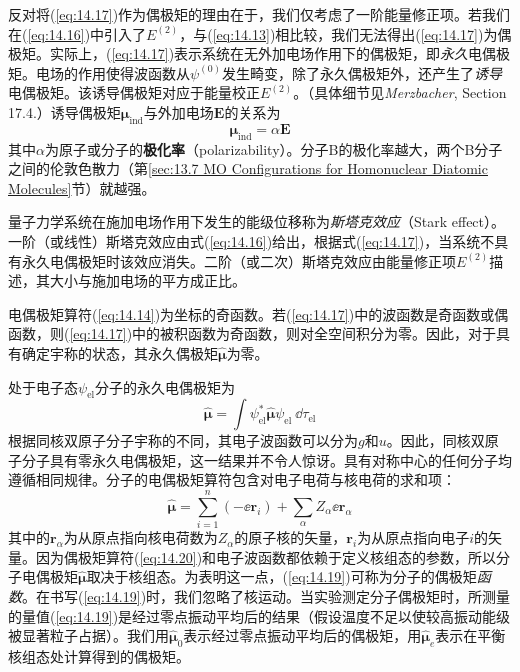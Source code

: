     反对将(\ref{eq:14.17})作为偶极矩的理由在于，我们仅考虑了一阶能量修正项。若我们在(\ref{eq:14.16})中引入了$E^{\left(2\right)}$，与(\ref{eq:14.13})相比较，我们无法得出(\ref{eq:14.17})为偶极矩。实际上，(\ref{eq:14.17})表示系统在无外加电场作用下的偶极矩，即\textit{永久}电偶极矩。电场的作用使得波函数从$\psi^{\left(0\right)}$发生畸变，除了永久偶极矩外，还产生了\textit{诱导}电偶极矩。该诱导偶极矩对应于能量校正$E^{\left(2\right)}$。（具体细节见\textit{Merzbacher}, Section 17.4.）诱导偶极矩$\symbf{\mu}_{\text{ind}}$与外加电场$\mathbf{E}$的关系为
    \begin{equation}
        \symbf{\mu}_{\text{ind}} = \alpha \mathbf{E}
        \label{eq:14.18}
    \end{equation}
    其中$\alpha$为原子或分子的\textbf{极化率}（polarizability）。分子B的极化率越大，两个B分子之间的伦敦色散力（第\ref{sec:13.7 MO Configurations for Homonuclear Diatomic Molecules}节）就越强。

    量子力学系统在施加电场作用下发生的能级位移称为\textit{斯塔克效应}（Stark effect）。一阶（或线性）斯塔克效应由式(\ref{eq:14.16})给出，根据式(\ref{eq:14.17})，当系统不具有永久电偶极矩时该效应消失。二阶（或二次）斯塔克效应由能量修正项$E^{\left(2\right)}$描述，其大小与施加电场的平方成正比。

    电偶极矩算符(\ref{eq:14.14})为坐标的奇函数。若(\ref{eq:14.17})中的波函数是奇函数或偶函数，则(\ref{eq:14.17})中的被积函数为奇函数，则对全空间积分为零。因此，对于具有确定宇称的状态，其永久偶极矩$\hat{\symbf{\mu}}$为零。

    处于电子态$\psi_{\text{el}}$分子的永久电偶极矩为
    \begin{equation}
        \hat{\symbf{\mu}} = \int \psi_{\text{el}}^* \hat{\symbf{\mu}} \psi_{\text{el}} \:\dd \tau_{\text{el}}
        \label{eq:14.19}
    \end{equation}
    根据同核双原子分子宇称的不同，其电子波函数可以分为$g$和$u$。因此，同核双原子分子具有零永久电偶极矩，这一结果并不令人惊讶。具有对称中心的任何分子均遵循相同规律。分子的电偶极矩算符包含对电子电荷与核电荷的求和项：
    \begin{equation}
        \hat{\symbf{\mu}} = \sum_{i=1}^{n} \left(-\ee \mathbf{r}_i\right) + \sum_{\alpha} Z_{\alpha} \ee \mathbf{r}_{\alpha}
        \label{eq:14.20}
    \end{equation}
    其中的$\mathbf{r}_{\alpha}$为从原点指向核电荷数为$Z_{\alpha}$的原子核的矢量，$\mathbf{r}_i$为从原点指向电子$i$的矢量。因为偶极矩算符(\ref{eq:14.20})和电子波函数都依赖于定义核组态的参数，所以分子电偶极矩$\hat{\symbf{\mu}}$取决于核组态。为表明这一点，(\ref{eq:14.19})可称为分子的偶极矩\textit{函数}。在书写(\ref{eq:14.19})时，我们忽略了核运动。当实验测定分子偶极矩时，所测量的量值(\ref{eq:14.19})是经过零点振动平均后的结果（假设温度不足以使较高振动能级被显著粒子占据）。我们用$\hat{\symbf{\mu}}_0$表示经过零点振动平均后的偶极矩，用$\hat{\symbf{\mu}}_e$表示在平衡核组态处计算得到的偶极矩。


